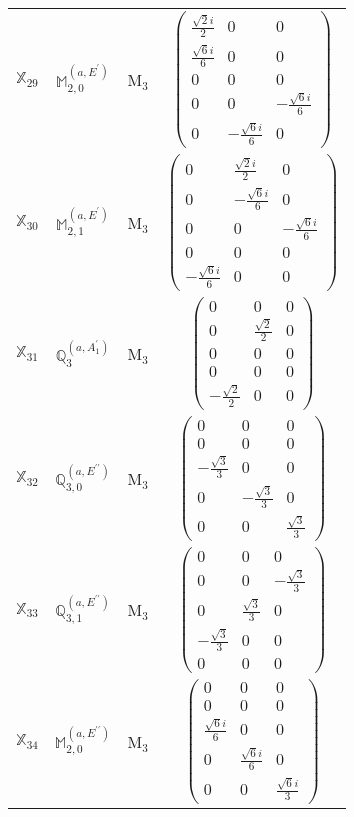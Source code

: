 \documentclass[fleqn,10pt,landscape]{article}
\begin{document}
\begin{itemize}
\begin{center}
\begin{longtable}{c|c|c|c}
$ \mathbb{X}_{29} $ & $\mathbb{M}_{2,0}^{(a,E^{\prime})}$ & M$_{3}$ & $\begin{pmatrix} \frac{\sqrt{2} i}{2} & 0 & 0 \\ \frac{\sqrt{6} i}{6} & 0 & 0 \\ 0 & 0 & 0 \\ 0 & 0 & - \frac{\sqrt{6} i}{6} \\ 0 & - \frac{\sqrt{6} i}{6} & 0 \end{pmatrix}$ \\
$ \mathbb{X}_{30} $ & $\mathbb{M}_{2,1}^{(a,E^{\prime})}$ & M$_{3}$ & $\begin{pmatrix} 0 & \frac{\sqrt{2} i}{2} & 0 \\ 0 & - \frac{\sqrt{6} i}{6} & 0 \\ 0 & 0 & - \frac{\sqrt{6} i}{6} \\ 0 & 0 & 0 \\ - \frac{\sqrt{6} i}{6} & 0 & 0 \end{pmatrix}$ \\
$ \mathbb{X}_{31} $ & $\mathbb{Q}_{3}^{(a,A_{1}^{\prime})}$ & M$_{3}$ & $\begin{pmatrix} 0 & 0 & 0 \\ 0 & \frac{\sqrt{2}}{2} & 0 \\ 0 & 0 & 0 \\ 0 & 0 & 0 \\ - \frac{\sqrt{2}}{2} & 0 & 0 \end{pmatrix}$ \\
$ \mathbb{X}_{32} $ & $\mathbb{Q}_{3,0}^{(a,E^{\prime\prime})}$ & M$_{3}$ & $\begin{pmatrix} 0 & 0 & 0 \\ 0 & 0 & 0 \\ - \frac{\sqrt{3}}{3} & 0 & 0 \\ 0 & - \frac{\sqrt{3}}{3} & 0 \\ 0 & 0 & \frac{\sqrt{3}}{3} \end{pmatrix}$ \\
$ \mathbb{X}_{33} $ & $\mathbb{Q}_{3,1}^{(a,E^{\prime\prime})}$ & M$_{3}$ & $\begin{pmatrix} 0 & 0 & 0 \\ 0 & 0 & - \frac{\sqrt{3}}{3} \\ 0 & \frac{\sqrt{3}}{3} & 0 \\ - \frac{\sqrt{3}}{3} & 0 & 0 \\ 0 & 0 & 0 \end{pmatrix}$ \\
$ \mathbb{X}_{34} $ & $\mathbb{M}_{2,0}^{(a,E^{\prime\prime})}$ & M$_{3}$ & $\begin{pmatrix} 0 & 0 & 0 \\ 0 & 0 & 0 \\ \frac{\sqrt{6} i}{6} & 0 & 0 \\ 0 & \frac{\sqrt{6} i}{6} & 0 \\ 0 & 0 & \frac{\sqrt{6} i}{3} \end{pmatrix}$ \\

\end{longtable}
\end{center}
\end{itemize}
\end{document}
